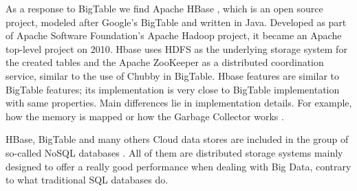 \par
As a response to BigTable we find Apache HBase \cite{ApacheHBase}, which is an open source project, modeled after Google's BigTable and written in Java. Developed as part of Apache Software Foundation's Apache Hadoop project, it became an Apache top-level project on 2010. Hbase uses HDFS as the underlying storage system for the created tables and the Apache ZooKeeper as a distributed coordination service, similar to the use of Chubby \cite{burrows2006chubby} in BigTable. Hbase features are similar to BigTable features; its implementation is very close to BigTable implementation with same properties. Main differences lie in implementation details. For example, how the memory is mapped or how the Garbage Collector works \cite {samar2011scalable}.
\par
HBase, BigTable and many others Cloud data stores are included in the group of so-called NoSQL databases \cite{NoSQLdatabases}. All of them are distributed storage systems mainly designed to offer a really good performance when dealing with Big Data, contrary to what traditional SQL databases do. 

\bigskip
{}
\bigskip


